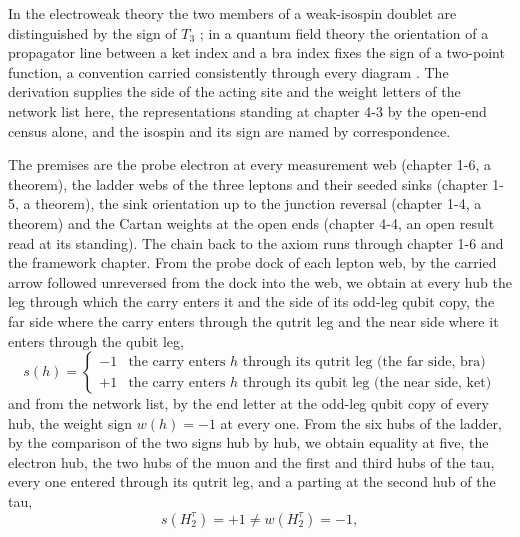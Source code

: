 \begin{chbridge}
In the electroweak theory the two members of a weak-isospin doublet are distinguished by the sign of $T_3$ \cite{Weinberg1967,StreaterWightman1964}; in a quantum field theory the orientation of a propagator line between a ket index and a bra index fixes the sign of a two-point function, a convention carried consistently through every diagram \cite{Peskin1995}. The derivation supplies the side of the acting site and the weight letters of the network list here, the representations standing at chapter 4-3 by the open-end census alone, and the isospin and its sign are named by correspondence.
\end{chbridge}
\begin{chproof}[exact]
The premises are the probe electron at every measurement web (chapter 1-6, a theorem), the ladder webs of the three leptons and their seeded sinks (chapter 1-5, a theorem), the sink orientation up to the junction reversal (chapter 1-4, a theorem) and the Cartan weights at the open ends (chapter 4-4, an open result read at its standing). The chain back to the axiom runs through chapter 1-6 and the framework chapter. From the probe dock of each lepton web, by the carried arrow followed unreversed from the dock into the web, we obtain at every hub the leg through which the carry enters it and the side of its odd-leg qubit copy, the far side where the carry enters through the qutrit leg and the near side where it enters through the qubit leg,
\begin{equation}
s(h) = \begin{cases} -1 & \text{the carry enters } h \text{ through its qutrit leg (the far side, bra)}\\ +1 & \text{the carry enters } h \text{ through its qubit leg (the near side, ket)} \end{cases}
\end{equation}
and from the network list, by the end letter at the odd-leg qubit copy of every hub, the weight sign $w(h) = -1$ at every one. From the six hubs of the ladder, by the comparison of the two signs hub by hub, we obtain equality at five, the electron hub, the two hubs of the muon and the first and third hubs of the tau, every one entered through its qutrit leg, and a parting at the second hub of the tau,
\begin{equation}
s(H_{2}^{\tau}) = +1 \neq w(H_{2}^{\tau}) = -1 ,
\end{equation}

\end{chproof}
